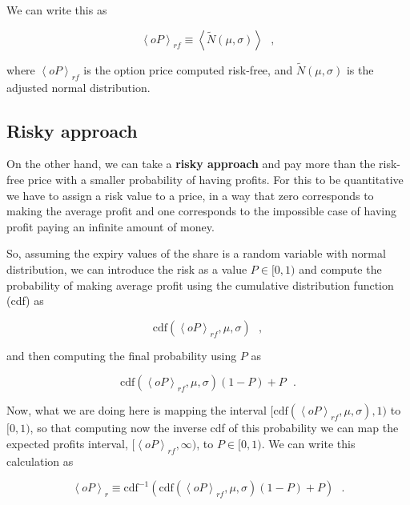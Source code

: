 \documentclass[8 pt]{article}
\newcommand{\avg}[1]{\left\langle #1 \right\rangle}
\begin{document}
We can write this as

\begin{equation}
  \avg{oP}_{rf} \equiv \avg{\tilde N(\mu, \sigma)} ~~~ ,
\end{equation}

where $\avg{oP}_{rf}$ is the option price computed risk-free, and $\tilde N(\mu, \sigma)$ is the adjusted normal distribution.

\subsection{Risky approach}

On the other hand, we can take a \textbf{risky approach} and pay more than the risk-free price with a smaller probability of having profits. For this to be quantitative we have to assign a risk value to a price, in a way that zero corresponds to making the average profit and one corresponds to the impossible case of having profit paying an infinite amount of money.

So, assuming the expiry values of the share is a random variable with normal distribution, we can introduce the risk as a value $P \in [0, 1)$ and compute the probability of making average profit using the cumulative distribution function (cdf) as

\begin{equation*}
  \text{cdf}(\avg{oP}_{rf}, \mu, \sigma) ~~~ ,
\end{equation*}

and then computing the final probability using $P$ as

\begin{equation*}
  \text{cdf}(\avg{oP}_{rf}, \mu, \sigma)(1 - P) + P ~~~ .
\end{equation*}

Now, what we are doing here is mapping the interval $[\text{cdf}(\avg{oP}_{rf}, \mu, \sigma), 1)$ to $[0, 1)$, so that computing now the inverse cdf of this probability we can map the expected profits interval, $[\avg{oP}_{rf}, \infty)$, to $P \in [0, 1)$. We can write this calculation as

\begin{equation}
  \avg{oP}_r \equiv \text{cdf}^{-1} \left( \text{cdf}(\avg{oP}_{rf}, \mu, \sigma)(1 - P) + P \right) ~~~ .
\end{equation}
\end{document}
